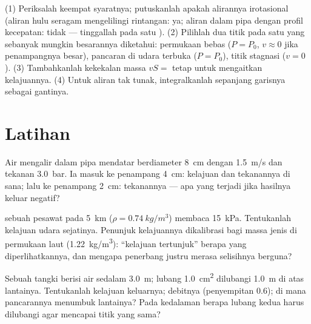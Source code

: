 \begin{method}\label{met:b2:euler-bernoulli:method}
(1) Periksalah keempat syaratnya; putuskanlah apakah alirannya
irotasional (aliran hulu seragam mengelilingi rintangan: ya; aliran
dalam pipa dengan profil kecepatan: tidak --- tinggallah pada satu ). (2) Pilihlah dua titik pada satu  yang sebanyak mungkin
besarannya diketahui: permukaan bebas ($P = P_0$, $v \approx 0$ jika
penampangnya besar), pancaran di udara terbuka ($P = P_0$), titik
stagnasi ($v = 0$). (3) Tambahkanlah kekekalan massa
$vS =$ tetap untuk mengaitkan kelajuannya. (4) Untuk aliran tak tunak,
integralkanlah  sepanjang garisnya sebagai gantinya.
\end{method}

\section{Latihan}

\begin{exercise}[$\star$]\label{exo:b2:euler-bernoulli:1}
Air mengalir dalam pipa mendatar berdiameter \qty{8}{cm} dengan \qty{1.5}{m/s}
dan tekanan \qty{3.0}{bar}. Ia masuk ke penampang \qty{4}{cm}: kelajuan
dan tekanannya di sana; lalu ke penampang \qty{2}{cm}: tekanannya --- apa
yang terjadi jika hasilnya keluar negatif?
\end{exercise}

\begin{exercise}[$\star$]\label{exo:b2:euler-bernoulli:2}
 sebuah pesawat pada \qty{5}{km} ($\rho = \qty{0.74}{kg/m^3}$)
membaca  \qty{15}{kPa}. Tentukanlah kelajuan udara
sejatinya. Penunjuk kelajuannya dikalibrasi bagi massa jenis di
permukaan laut (\qty{1.22}{kg/m^3}): ``kelajuan tertunjuk'' berapa yang
diperlihatkannya, dan mengapa penerbang justru merasa selisihnya berguna?
\end{exercise}

\begin{exercise}[$\star$]\label{exo:b2:euler-bernoulli:3}
Sebuah tangki berisi air sedalam \qty{3.0}{m}; lubang \qty{1.0}{cm^2}
dilubangi \qty{1.0}{m} di atas lantainya. Tentukanlah kelajuan keluarnya;
debitnya (penyempitan $0.6$); di mana pancarannya menumbuk lantainya?
Pada kedalaman berapa lubang kedua harus dilubangi agar mencapai titik
yang sama?
\end{exercise}

